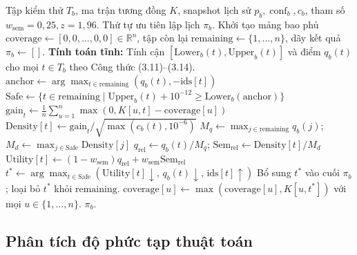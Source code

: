 \begin{algorithm}[H]
\caption{Thuật toán UGCS v2 (Uncertainty-Guarded Cost-aware Semantic Ranking)}
\label{algo:ugcs_v2}
\begin{algorithmic}[1]
\Require Tập kiểm thử $T_b$, ma trận tương đồng $K$, snapshot lịch sử $p_b, \operatorname{conf}_b, c_b$, tham số $w_{\text{sem}} = 0{,}25, z = 1{,}96$.
\Ensure Thứ tự ưu tiên lập lịch $\pi_b$.
\State Khởi tạo mảng bao phủ $\text{coverage} \leftarrow [0{,}0, \dots, 0{,}0] \in \mathbb{R}^n$, tập còn lại $\text{remaining} \leftarrow \{1, \dots, n\}$, dãy kết quả $\pi_b \leftarrow []$.
\State \textbf{Tính toán tĩnh:} Tính cận $[\text{Lower}_b(t), \text{Upper}_b(t)]$ và điểm $q_b(t)$ cho mọi $t \in T_b$ theo Công thức (3.11)--(3.14).
    \State $\text{anchor} \leftarrow \arg\max_{t \in \text{remaining}} (q_b(t), -\text{ids}[t])$
    \State $\text{Safe} \leftarrow \{t \in \text{remaining} \mid \text{Upper}_b(t) + 10^{-12} \ge \text{Lower}_b(\text{anchor})\}$
        \State $\text{gain}_t \leftarrow \frac{1}{n} \sum_{u=1}^n \max(0, K[u, t] - \text{coverage}[u])$
        \State $\text{Density}[t] \leftarrow \text{gain}_t / \sqrt{\max(c_b(t), 10^{-6})}$
    \EndFor
    \State $M_q \leftarrow \max_{j \in \text{remaining}} q_b(j)$; \quad $M_d \leftarrow \max_{j \in \text{Safe}} \text{Density}[j]$
        \State $q_{\text{rel}} \leftarrow q_b(t) / M_q$; \quad $\text{Sem}_{\text{rel}} \leftarrow \text{Density}[t] / M_d$
        \State $\text{Utility}[t] \leftarrow (1 - w_{\text{sem}}) q_{\text{rel}} + w_{\text{sem}} \text{Sem}_{\text{rel}}$
    \EndFor
    \State $t^* \leftarrow \arg\max_{t \in \text{Safe}} (\text{Utility}[t] \downarrow, \, q_b(t) \downarrow, \, \text{ids}[t] \uparrow)$
    \State Bổ sung $t^*$ vào cuối $\pi_b$; \quad loại bỏ $t^*$ khỏi $\text{remaining}$.
    \State $\text{coverage}[u] \leftarrow \max(\text{coverage}[u], K[u, t^*])$ với mọi $u \in \{1, \dots, n\}$.
\EndWhile
\State \Return $\pi_b$.
\end{algorithmic}
\end{algorithm}

\subsection{Phân tích độ phức tạp thuật toán}
\label{subsec:complexity_analysis}

